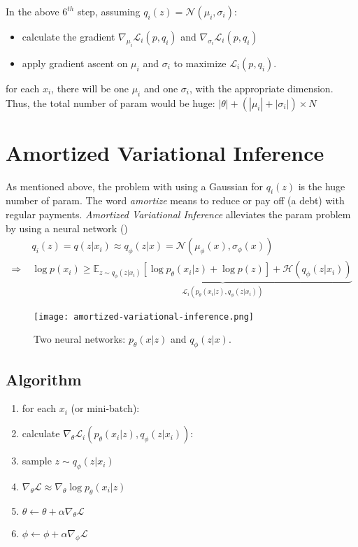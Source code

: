In the above $6^{th}$ step, assuming $q_i(z) = \mathcal{N}(\mu_i, \sigma_i)$:
\begin{itemize}
	\item calculate the gradient $\nabla_{\mu_i} \mathcal{L}_i (p, q_i)$ and $\nabla_{\sigma_i} \mathcal{L}_i (p, q_i)$
	\item apply gradient ascent on $\mu_i$ and $\sigma_i$ to maximize $\mathcal{L}_i (p, q_i)$.
\end{itemize}

 for each $x_i$, there will be one $\mu_i$ and one $\sigma_i$, with the appropriate dimension. Thus, the total number of \ac{param} would be huge: $|\theta| + (|\mu_i| + |\sigma_i|) \times N$

\section{Amortized Variational Inference}
As mentioned above, the problem with using a Gaussian for $q_i(z)$ is the huge number of \ac{param}. The word \textit{amortize} means to reduce or pay off (a debt) with regular payments. \textit{Amortized Variational Inference} alleviates the \ac{param} problem by using a neural network ()
\begin{align}
	&q_i(z) = q(z | x_i) \approx q_\phi(z|x) = \mathcal{N}(\mu_\phi(x), \sigma_\phi(x))\\
	\Rightarrow\;& \log p(x_i) \geq \underbrace{\mathbb{E}_{z\sim q_\phi(z|x_i)} [ \log p_\theta(x_i|z) + \log p(z) ] + \mathcal{H}(q_\phi(z|x_i))}_{\textstyle \mathcal{L}_i (p_\theta(x_i|z), q_\phi(z|x_i))}
\end{align}

\begin{figure}[hbt!]
	\centering
	\texttt{[image: amortized-variational-inference.png]}
	\caption{Two neural networks: $p_\theta(x|z)$ and $q_\phi(z|x)$.}
	\label{fig:amortized-variational-inference}
\end{figure}

\subsection{Algorithm}
\begin{enumerate}
	\item for each $x_i$ (or mini-batch):
	\item \quad calculate $\nabla_\theta \mathcal{L}_i (p_\theta(x_i|z), q_\phi(z|x_i))$:
	\item \qquad sample $z \sim q_\phi(z|x_i)$
	\item \qquad $\nabla_\theta \mathcal{L} \approx \nabla_\theta \log p_\theta(x_i|z)$
	\item \quad $\theta \leftarrow \theta + \alpha \nabla_\theta \mathcal{L}$
	\item \quad $\phi \leftarrow \phi + \alpha \nabla_\phi \mathcal{L}$
\end{enumerate}

